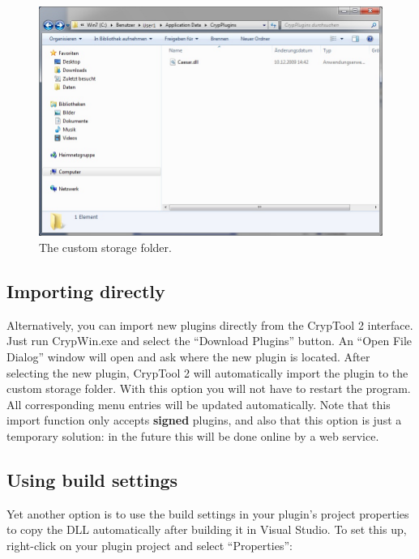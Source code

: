 \begin{figure}[h]
	\centering
		\includegraphics[width=1.00\textwidth]{figures/custom_storage.jpg}
	\caption{The custom storage folder.}
	\label{fig:custom_storage}
\end{figure}

\subsection{Importing directly}
\label{sec:ImportingDirectly}

Alternatively, you can import new plugins directly from the CrypTool 2 interface. Just run \mbox{CrypWin.exe} and select the ``Download Plugins'' button. An ``Open File Dialog'' window will open and ask where the new plugin is located. After selecting the new plugin, CrypTool 2 will automatically import the plugin to the custom storage folder. With this option you will not have to restart the program. All corresponding menu entries will be updated automatically. Note that this import function only accepts \textbf{signed} plugins, and also that this option is just a temporary solution: in the future this will be done online by a web service.
\clearpage

\subsection{Using build settings}
\label{sec:UsingBuildSettings}

Yet another option is to use the build settings in your plugin's project properties to copy the DLL automatically after building it in Visual Studio. To set this up, right-click on your plugin project and select ``Properties'':

